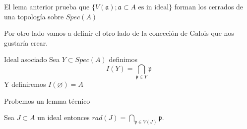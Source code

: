 \documentclass[14pt]{extarticle}
\begin{document}
\begin{observacion}{}{}
    El lema anterior prueba que $\{V(\mathfrak{a}); \mathfrak{a} \subset A \mbox{ es in ideal}\}$
    forman los cerrados de una topología sobre $Spec(A)$
\end{observacion}

Por otro lado vamos a definir el otro lado de la conección de 
Galois que nos gustaría crear.

\begin{definicion}{Ideal asociado}{}
    Sea $Y \subset Spec(A)$ definimos
    $$I(Y) = \bigcap_{\mathfrak{p}\in Y} \mathfrak{p}$$
    Y definiremos $I(\varnothing) = A$
\end{definicion}

Probemos un lemma técnico
\begin{lema}{}{}
    Sea $J \subset A$ un ideal entonces
    $rad(J) = \bigcap_{\mathfrak{p} \in V(J)} \mathfrak{p}$.
\end{lema}
\end{document}
